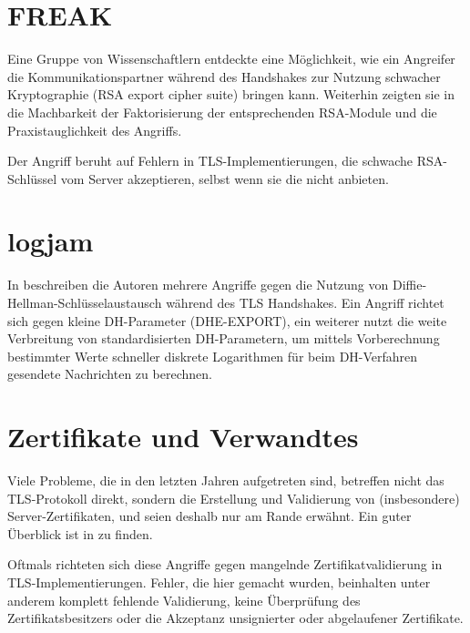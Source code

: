 \section{FREAK}

\label{sec_attack_freak}

Eine Gruppe von Wissenschaftlern entdeckte eine Möglichkeit, wie ein Angreifer die Kommunikationspartner während des Handshakes zur Nutzung schwacher Kryptographie (RSA export cipher suite) bringen kann. Weiterhin zeigten sie in \cite{freak15} die Machbarkeit der Faktorisierung der entsprechenden RSA-Module und die Praxistauglichkeit des Angriffs.

Der Angriff beruht auf Fehlern in TLS-Implementierungen, die schwache RSA-Schlüssel vom Server akzeptieren, selbst wenn sie die \ciphersuites{} nicht anbieten.

\section{logjam}

In \cite{logjam15} beschreiben die Autoren mehrere Angriffe gegen die Nutzung von Diffie-Hellman-Schlüsselaustausch während des TLS Handshakes. Ein Angriff richtet sich gegen kleine DH-Parameter (DHE-EXPORT), ein weiterer nutzt die weite Verbreitung von standardisierten DH-Parametern, um mittels Vorberechnung bestimmter Werte schneller diskrete Logarithmen für beim DH-Verfahren gesendete Nachrichten zu berechnen.

\section{Zertifikate und Verwandtes}

\label{sec_certificates}

Viele Probleme, die in den letzten Jahren aufgetreten sind, betreffen nicht das TLS-Protokoll direkt, sondern die Erstellung und Validierung von (insbesondere) Server-Zertifikaten, und seien deshalb nur am Rande erwähnt. Ein guter Überblick ist in \cite{meyer13} zu finden.

Oftmals richteten sich diese Angriffe gegen mangelnde Zertifikatvalidierung in TLS-Implementierungen. Fehler, die hier gemacht wurden, beinhalten unter anderem komplett fehlende Validierung, keine Überprüfung des Zertifikatsbesitzers oder die Akzeptanz unsignierter oder abgelaufener Zertifikate.

